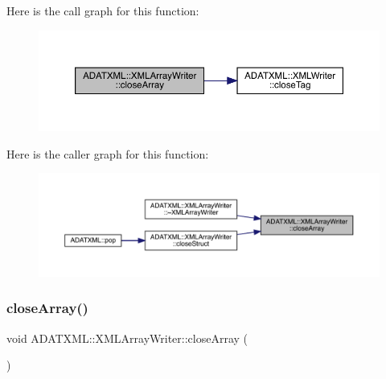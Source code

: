 Here is the call graph for this function\+:\nopagebreak
\begin{figure}[H]
\begin{center}
\leavevmode
\includegraphics[width=350pt]{dc/df3/classADATXML_1_1XMLArrayWriter_a5d6b79a0e8add658220f21e5fc138230_cgraph}
\end{center}
\end{figure}
Here is the caller graph for this function\+:\nopagebreak
\begin{figure}[H]
\begin{center}
\leavevmode
\includegraphics[width=350pt]{dc/df3/classADATXML_1_1XMLArrayWriter_a5d6b79a0e8add658220f21e5fc138230_icgraph}
\end{center}
\end{figure}
\mbox{\label{classADATXML_1_1XMLArrayWriter_a5d6b79a0e8add658220f21e5fc138230}} 
\subsubsection{\texorpdfstring{closeArray()}{closeArray()}\hspace{0.1cm}{\footnotesize\ttfamily [2/2]}}
{\footnotesize\ttfamily void A\+D\+A\+T\+X\+M\+L\+::\+X\+M\+L\+Array\+Writer\+::close\+Array (\begin{DoxyParamCaption}{ }\end{DoxyParamCaption})}

\mbox{\label{classADATXML_1_1XMLArrayWriter_a5a849f8851bce99654c44dc08b1fe486}} 
